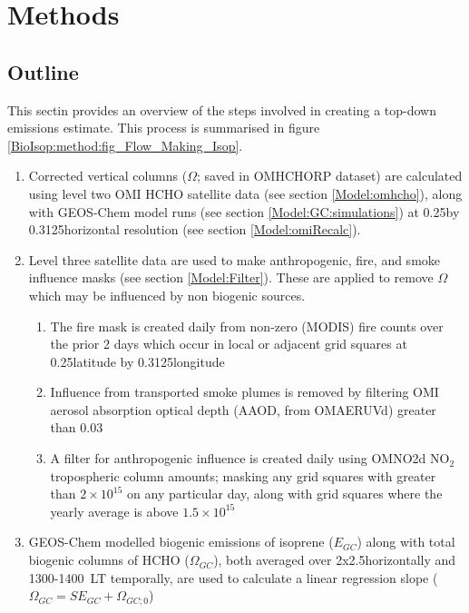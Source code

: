     
    
\section{Methods}
  \label{BioIsop:method}
  
  \subsection{Outline}
    This sectin provides an overview of the steps involved in creating a top-down emissions estimate. %
    This process is summarised in figure \ref{BioIsop:method:fig_Flow_Making_Isop}.
    \begin{enumerate}
      \item 
        Corrected vertical columns ($\Omega$; saved in OMHCHORP dataset) are calculated using level two OMI HCHO satellite data (see section \ref{Model:omhcho}), along with GEOS-Chem model runs (see section \ref{Model:GC:simulations}) at 0.25\degr by 0.3125\degr horizontal resolution (see section \ref{Model:omiRecalc}).
      \item 
        Level three satellite data are used to make anthropogenic, fire, and smoke influence masks (see section \ref{Model:Filter}).
        These are applied to remove $\Omega$ which may be influenced by non biogenic sources. 
      \begin{enumerate}
        \item 
          The fire mask is created daily from non-zero (MODIS) fire counts over the prior 2 days which occur in local or adjacent grid squares at 0.25\degr latitude by 0.3125\degr longitude
        \item 
          Influence from transported smoke plumes is removed by filtering OMI aerosol absorption optical depth (AAOD, from OMAERUVd) greater than 0.03
        \item 
          A filter for anthropogenic influence is created daily using OMNO2d NO$_2$ tropospheric column amounts; masking any grid squares with greater than $2\times 10 ^{15}$ on any particular day, along with grid squares where the yearly average is above $1.5 \times 10^{15}$\moleccm
      \end{enumerate}
      \item 
        GEOS-Chem modelled biogenic emissions of isoprene ($E_{GC}$) along with total biogenic columns of HCHO ($\Omega_{GC}$), both averaged over 2x2.5\degr horizontally  and 1300-1400~LT temporally, are used to calculate a linear regression slope ($\Omega_{GC}=S E_{GC} + \Omega_{GC;0}$)

\end{enumerate}
